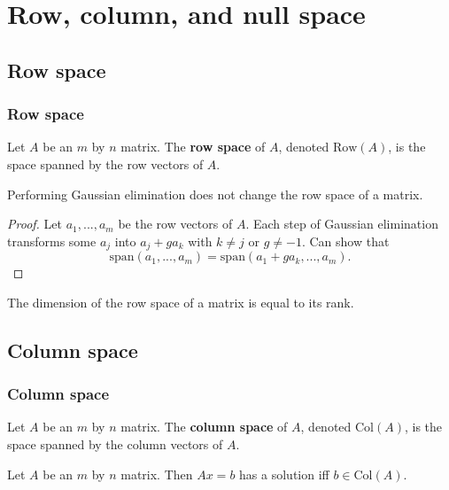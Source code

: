 \documentclass[compress]{beamer}
\newcommand{\spn}{\mathrm{span}}
\newcommand{\row}{\mathrm{Row}}
\newcommand{\col}{\mathrm{Col}}
\begin{document}
\section{Row, column, and null space}

\subsection{Row space}
\begin{frame}
  \frametitle{Row space}
  \begin{definition}
    Let $A$ be an $m$ by $n$ matrix. The \textbf{row space} of $A$,
    denoted $\row (A)$, is the space spanned by the row vectors of $A$.
  \end{definition}
  \begin{lemma}
    Performing Gaussian elimination does not change the row space of a
    matrix. 
  \end{lemma}
  \begin{proof}
    Let $a_{1},...,a_m$ be the row vectors of $A$. Each step of Gaussian
    elimination transforms some $a_j$ into $a_j + g a_k$ with $k \neq j$
    or $g \neq -1$. Can show that
    \[ \spn(a_1,...,a_m) = \spn(a_1 + g a_k , ..., a_m). \]
  \end{proof}
  \begin{corollary}\label{cor:rankdimrow}
    The dimension of the row space of a matrix is equal to its rank.
  \end{corollary}
\end{frame}

\subsection{Column space}

\begin{frame}
  \frametitle{Column space}
  \begin{definition}
    Let $A$ be an $m$ by $n$ matrix. The \textbf{column space} of $A$,
    denoted $\col(A)$, is the space spanned by the column vectors of
    $A$.
  \end{definition}
  \begin{lemma}
    Let $A$ be an $m$ by $n$ matrix. Then $A x = b$ has a solution iff $b
    \in \col(A)$.
  \end{lemma}
\end{frame}
\end{document}
